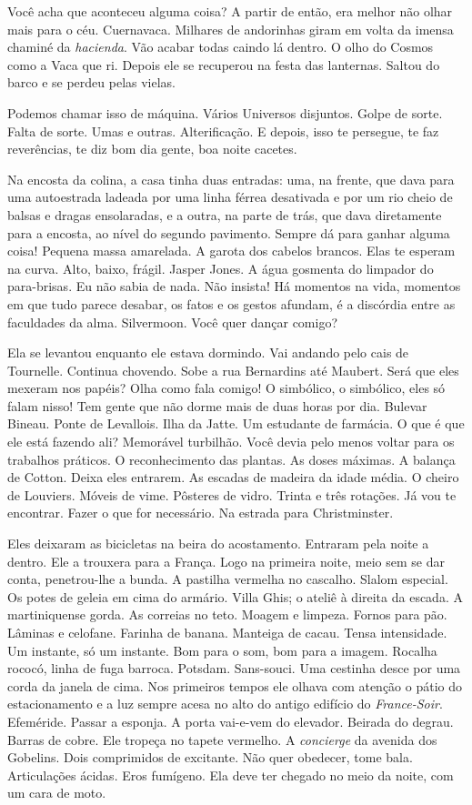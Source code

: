 Você acha que aconteceu alguma coisa? A partir de então, era melhor não
olhar mais para o céu. Cuernavaca. Milhares de andorinhas giram em volta
da imensa chaminé da \emph{hacienda}. Vão acabar todas caindo lá dentro.
O olho do Cosmos como a Vaca que ri. Depois ele se recuperou na festa
das lanternas. Saltou do barco e se perdeu pelas vielas.

Podemos chamar isso de máquina. Vários Universos disjuntos. Golpe de
sorte. Falta de sorte. Umas e outras. Alterificação. E depois, isso te
persegue, te faz reverências, te diz bom dia gente, boa noite cacetes.

Na encosta da colina, a casa tinha duas entradas: uma, na frente, que
dava para uma autoestrada ladeada por uma linha férrea desativada e por
um rio cheio de balsas e dragas ensolaradas, e a outra, na parte de
trás, que dava diretamente para a encosta, ao nível do segundo
pavimento. Sempre dá para ganhar alguma coisa! Pequena massa amarelada.
A garota dos cabelos brancos. Elas te esperam na curva. Alto, baixo,
frágil. Jasper Jones. A água gosmenta do limpador do para-brisas. Eu não
sabia de nada. Não insista! Há momentos na vida, momentos em que tudo
parece desabar, os fatos e os gestos afundam, é a discórdia entre as
faculdades da alma. Silvermoon. Você quer dançar comigo?

Ela se levantou enquanto ele estava dormindo. Vai andando pelo cais de
Tournelle. Continua chovendo. Sobe a rua Bernardins até Maubert. Será
que eles mexeram nos papéis? Olha como fala comigo! O simbólico, o
simbólico, eles só falam nisso! Tem gente que não dorme mais de duas
horas por dia. Bulevar Bineau. Ponte de Levallois. Ilha da Jatte. Um
estudante de farmácia. O que é que ele está fazendo ali? Memorável
turbilhão. Você devia pelo menos voltar para os trabalhos práticos. O
reconhecimento das plantas. As doses máximas. A balança de Cotton. Deixa
eles entrarem. As escadas de madeira da idade média. O cheiro de
Louviers. Móveis de vime. Pôsteres de vidro. Trinta e três rotações. Já
vou te encontrar. Fazer o que for necessário. Na estrada para
Christminster.

Eles deixaram as bicicletas na beira do acostamento. Entraram pela noite
a dentro. Ele a trouxera para a França. Logo na primeira noite, meio sem
se dar conta, penetrou-lhe a bunda. A pastilha vermelha no cascalho.
Slalom especial. Os potes de geleia em cima do armário. Villa Ghis; o
ateliê à direita da escada. A martiniquense gorda. As correias no teto.
Moagem e limpeza. Fornos para pão. Lâminas e celofane. Farinha de
banana. Manteiga de cacau. Tensa intensidade. Um instante, só um
instante. Bom para o som, bom para a imagem. Rocalha rococó, linha de
fuga barroca. Potsdam. Sans-souci. Uma cestinha desce por uma corda da
janela de cima. Nos primeiros tempos ele olhava com atenção o pátio do
estacionamento e a luz sempre acesa no alto do antigo edifício do
\emph{France-Soir}. Efeméride. Passar a esponja. A porta vai-e-vem do
elevador. Beirada do degrau. Barras de cobre. Ele tropeça no tapete
vermelho. A \emph{concierge} da avenida dos Gobelins. Dois comprimidos
de excitante. Não quer obedecer, tome bala. Articulações ácidas. Eros
fumígeno. Ela deve ter chegado no meio da noite, com um cara de moto.

